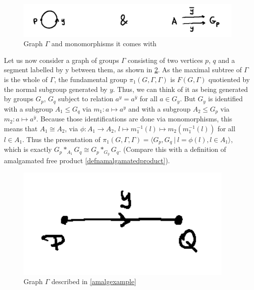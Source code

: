 \begin{figure}[h]
    \centering
    \includegraphics[width=0.5\linewidth]{sections/alicja/HNN loop and monomorphisms.jpeg}
    \caption{Graph $\Gamma$ and monomorphisms it comes with}
    \label{loopHNN}
\end{figure}

\begin{example}\cite[section I.5.1]{Ser80}\label{amalgexample}
    Let us now consider a graph of groups $\Gamma$ consisting of two vertices $p$, $q$ and a segment labelled by y between them, as shown in \ref{amalggraph}. As the maximal subtree of $\Gamma$ is the whole of $\Gamma$, the fundamental group $\pi_1(G,\Gamma,\Gamma)$ is $F(G,\Gamma)$ quotiented by the normal subgroup generated by $y$. Thus, we can think of it as being generated by groups $G_p$, $G_q$ subject to relation $a^y = a^{\overline{y}}$ for all $a \in G_y$. But $G_y$ is identified with a subgroup $A_1 \le G_q$ via $m_1 : a \mapsto a^y$ and with a subgroup $A_2 \le G_p$ via $m_2: a \mapsto a^{\overline{y}}$. Because those identifications are done via monomorphisms, this means that $A_1 \cong A_2$, via $\phi: A_1 \to A_2$, $l \mapsto m_1^{-1}(l) \mapsto m_2(m_1^{-1}(l))$ for all $l \in A_1$. Thus the presentation of $\pi_1(G,\Gamma,\Gamma) = \langle G_p,G_q \: | \: l = \phi(l), l \in A_1\rangle$, which is exactly $G_p\ast_{A_1}G_q \cong G_p \ast_{G_y}G_q$. (Compare this with a definition of amalgamated free product \ref{defnamalgamatedproduct}).
\end{example}



\begin{figure}[h]
    \centering
    \includegraphics[scale = 0.14]{sections/alicja/Segment of groups.jpeg}
    \caption{Graph $\Gamma$ described in \ref{amalgexample}}
    \label{amalggraph}
\end{figure}

